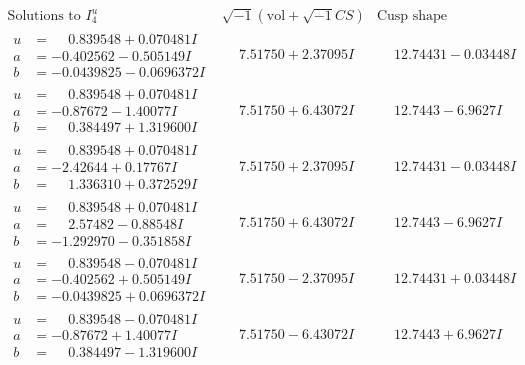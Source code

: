 \documentclass[1p]{elsarticle_modified}
\theoremstyle{definition}
\newcommand{\I}{\sqrt{-1}}
\begin{document}
$$\begin{array}{c|c|c}  
\text{Solutions to }I^u_{4}& \I (\text{vol} + \sqrt{-1}CS) & \text{Cusp shape}\\
 \hline 
\begin{aligned}
u &= \phantom{-}0.839548 + 0.070481 I \\
a &= -0.402562 - 0.505149 I \\
b &= -0.0439825 - 0.0696372 I\end{aligned}
 & \phantom{-}7.51750 + 2.37095 I & \phantom{-}12.74431 - 0.03448 I \\ \hline\begin{aligned}
u &= \phantom{-}0.839548 + 0.070481 I \\
a &= -0.87672 - 1.40077 I \\
b &= \phantom{-}0.384497 + 1.319600 I\end{aligned}
 & \phantom{-}7.51750 + 6.43072 I & \phantom{-}12.7443 - 6.9627 I \\ \hline\begin{aligned}
u &= \phantom{-}0.839548 + 0.070481 I \\
a &= -2.42644 + 0.17767 I \\
b &= \phantom{-}1.336310 + 0.372529 I\end{aligned}
 & \phantom{-}7.51750 + 2.37095 I & \phantom{-}12.74431 - 0.03448 I \\ \hline\begin{aligned}
u &= \phantom{-}0.839548 + 0.070481 I \\
a &= \phantom{-}2.57482 - 0.88548 I \\
b &= -1.292970 - 0.351858 I\end{aligned}
 & \phantom{-}7.51750 + 6.43072 I & \phantom{-}12.7443 - 6.9627 I \\ \hline\begin{aligned}
u &= \phantom{-}0.839548 - 0.070481 I \\
a &= -0.402562 + 0.505149 I \\
b &= -0.0439825 + 0.0696372 I\end{aligned}
 & \phantom{-}7.51750 - 2.37095 I & \phantom{-}12.74431 + 0.03448 I \\ \hline\begin{aligned}
u &= \phantom{-}0.839548 - 0.070481 I \\
a &= -0.87672 + 1.40077 I \\
b &= \phantom{-}0.384497 - 1.319600 I\end{aligned}
 & \phantom{-}7.51750 - 6.43072 I & \phantom{-}12.7443 + 6.9627 I \\ \hline\begin{aligned}

\end{aligned}
\end{array}$$
\end{document}
